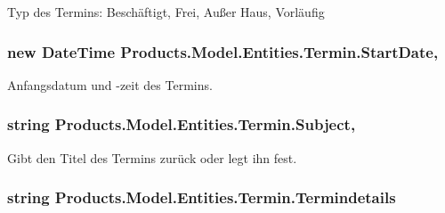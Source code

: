 Typ des Termins\+: Beschäftigt, Frei, Außer Haus, Vorläufig 

\subsubsection[{\texorpdfstring{Start\+Date}{StartDate}}]{\setlength{\rightskip}{0pt plus 5cm}new Date\+Time Products.\+Model.\+Entities.\+Termin.\+Start\+Date\hspace{0.3cm}{\ttfamily [get]}, {\ttfamily [set]}}\hypertarget{class_products_1_1_model_1_1_entities_1_1_termin_a9a8cd07acc481ea1ac38831de7153a37}{}\label{class_products_1_1_model_1_1_entities_1_1_termin_a9a8cd07acc481ea1ac38831de7153a37}


Anfangsdatum und -\/zeit des Termins. 

\subsubsection[{\texorpdfstring{Subject}{Subject}}]{\setlength{\rightskip}{0pt plus 5cm}string Products.\+Model.\+Entities.\+Termin.\+Subject\hspace{0.3cm}{\ttfamily [get]}, {\ttfamily [set]}}\hypertarget{class_products_1_1_model_1_1_entities_1_1_termin_a1b6185a4b4fc0c78248c1e323bf8f830}{}\label{class_products_1_1_model_1_1_entities_1_1_termin_a1b6185a4b4fc0c78248c1e323bf8f830}


Gibt den Titel des Termins zurück oder legt ihn fest. 

\subsubsection[{\texorpdfstring{Termindetails}{Termindetails}}]{\setlength{\rightskip}{0pt plus 5cm}string Products.\+Model.\+Entities.\+Termin.\+Termindetails\hspace{0.3cm}{\ttfamily [get]}}\hypertarget{class_products_1_1_model_1_1_entities_1_1_termin_a5a2ef29d3a9249ed680756af2181a742}{}\label{class_products_1_1_model_1_1_entities_1_1_termin_a5a2ef29d3a9249ed680756af2181a742}


